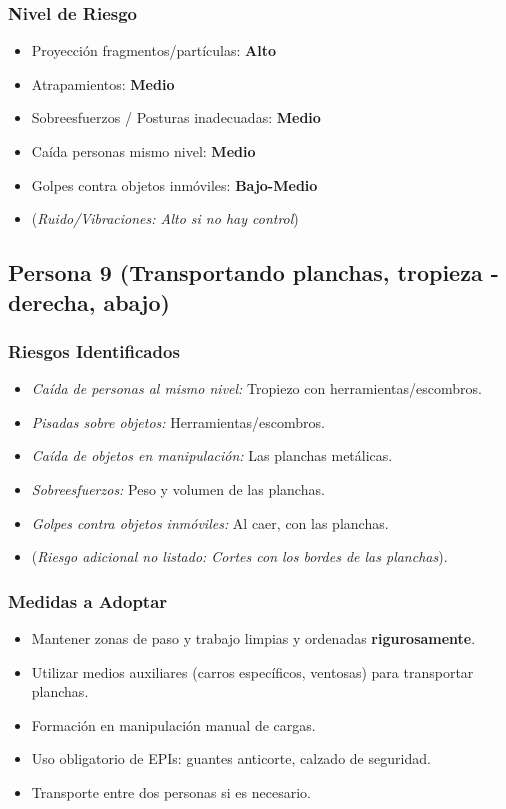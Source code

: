 \documentclass[12pt,a4paper]{article}
\begin{document}
	\subsubsection{Nivel de Riesgo}
	\begin{itemize}
		\item Proyección fragmentos/partículas: \textbf{Alto}
		\item Atrapamientos: \textbf{Medio}
		\item Sobreesfuerzos / Posturas inadecuadas: \textbf{Medio}
		\item Caída personas mismo nivel: \textbf{Medio}
		\item Golpes contra objetos inmóviles: \textbf{Bajo-Medio}
		\item (\textit{Ruido/Vibraciones: Alto si no hay control})
	\end{itemize}
	
	\bigskip\hrulefill\bigskip
	
	\subsection{Persona 9 (Transportando planchas, tropieza - derecha, abajo)}
	
	\subsubsection{Riesgos Identificados}
	\begin{itemize}
		\item \textit{Caída de personas al mismo nivel:} Tropiezo con herramientas/escombros.
		\item \textit{Pisadas sobre objetos:} Herramientas/escombros.
		\item \textit{Caída de objetos en manipulación:} Las planchas metálicas.
		\item \textit{Sobreesfuerzos:} Peso y volumen de las planchas.
		\item \textit{Golpes contra objetos inmóviles:} Al caer, con las planchas.
		\item (\textit{Riesgo adicional no listado: Cortes con los bordes de las planchas}).
	\end{itemize}
	
	\subsubsection{Medidas a Adoptar}
	\begin{itemize}
		\item Mantener zonas de paso y trabajo limpias y ordenadas \textbf{rigurosamente}.
		\item Utilizar medios auxiliares (carros específicos, ventosas) para transportar planchas.
		\item Formación en manipulación manual de cargas.
		\item Uso obligatorio de EPIs: guantes anticorte, calzado de seguridad.
		\item Transporte entre dos personas si es necesario.
	\end{itemize}
	
\end{document}
